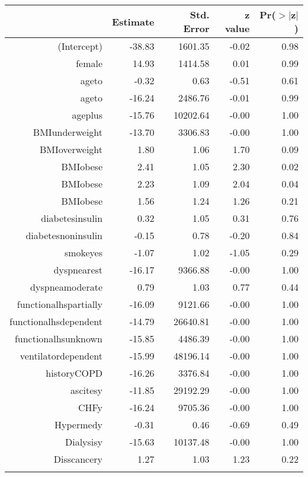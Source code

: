 \bigskip\bigskip
\centering
\begin{tabular}{rrrrr}
  \hline
 & Estimate & Std. Error & z value & Pr($>$$|$z$|$) \\ 
  \hline
(Intercept) & -38.83 & 1601.35 & -0.02 & 0.98 \\ 
  female & 14.93 & 1414.58 & 0.01 & 0.99 \\ 
  age\-65\-to\-74 & -0.32 & 0.63 & -0.51 & 0.61 \\ 
  age\-75\-to\-84 & -16.24 & 2486.76 & -0.01 & 0.99 \\ 
  age\-85\-plus & -15.76 & 10202.64 & -0.00 & 1.00 \\ 
  BMI\-underweight & -13.70 & 3306.83 & -0.00 & 1.00 \\ 
  BMI\-overweight & 1.80 & 1.06 & 1.70 & 0.09 \\ 
  BMI\-obese\-1 & 2.41 & 1.05 & 2.30 & 0.02 \\ 
  BMI\-obese\-2 & 2.23 & 1.09 & 2.04 & 0.04 \\ 
  BMI\-obese\-3 & 1.56 & 1.24 & 1.26 & 0.21 \\ 
  diabetes\-insulin & 0.32 & 1.05 & 0.31 & 0.76 \\ 
  diabetes\-noninsulin & -0.15 & 0.78 & -0.20 & 0.84 \\ 
  smoke\-yes & -1.07 & 1.02 & -1.05 & 0.29 \\ 
  dyspnea\-rest & -16.17 & 9366.88 & -0.00 & 1.00 \\ 
  dyspnea\-moderate & 0.79 & 1.03 & 0.77 & 0.44 \\ 
  functional\-hs\-partially & -16.09 & 9121.66 & -0.00 & 1.00 \\ 
  functional\-hs\-dependent & -14.79 & 26640.81 & -0.00 & 1.00 \\ 
  functional\-hs\-unknown & -15.85 & 4486.39 & -0.00 & 1.00 \\ 
  ventilator\-dependent & -15.99 & 48196.14 & -0.00 & 1.00 \\ 
  history\-COPD & -16.26 & 3376.84 & -0.00 & 1.00 \\ 
  ascites\-y & -11.85 & 29192.29 & -0.00 & 1.00 \\ 
  CHF\-y & -16.24 & 9705.36 & -0.00 & 1.00 \\ 
  Hyper\-med\-y & -0.31 & 0.46 & -0.69 & 0.49 \\ 
  Dialysis\-y & -15.63 & 10137.48 & -0.00 & 1.00 \\ 
  Diss\-cancer\-y & 1.27 & 1.03 & 1.23 & 0.22 \\ 
$$
\end{tabular}
